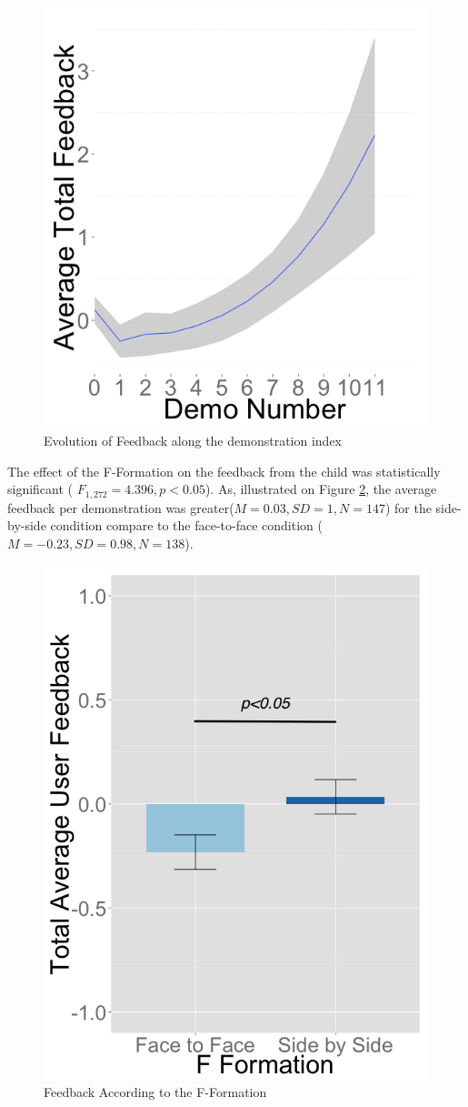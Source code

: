 \documentclass[letterpaper, 10 pt, conference]{ieeeconf}  %
\begin{document}
\begin{figure}
	\centering
	\includegraphics[width=0.8\linewidth]{figures/plots/evoldemo}
	\caption{Evolution of Feedback along the demonstration index}
	\label{fig:uf_nb}
\end{figure}
 
The effect of the F-Formation on the feedback from the child was statistically significant ( $F_{1,272}= 4.396, p<0.05$). As, illustrated on Figure \ref{fig:userfeedback_fformation_se}, the average feedback per demonstration was greater($M=0.03, SD=1, N=147$) for the side-by-side condition compare to the face-to-face condition ($M=-0.23, SD=0.98, N=138$).
 \begin{figure}
 	\centering
 	\includegraphics[width=0.6\linewidth]{figures/plots/userfeedback_fformation_se}
 	\caption{Feedback According to the F-Formation}
 	\label{fig:userfeedback_fformation_se}
 \end{figure}
\end{document}
